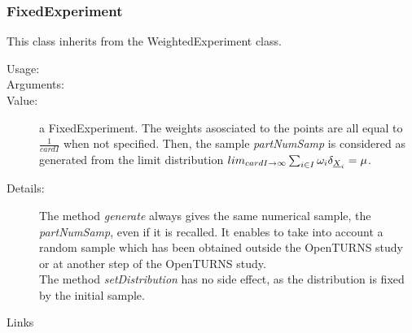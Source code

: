 \subsubsection{FixedExperiment}


This class inherits from the WeightedExperiment class.\\

\begin{description}

\item[Usage:] \rule{0pt}{1em}

\item[Arguments:]   \rule{0pt}{1em}

\item[Value:] a FixedExperiment. The weights asosciated to the points are all equal to $\displaystyle \frac{1}{cardI}$ when not specified. Then, the sample \textit{partNumSamp} is considered as generated from the limit distribution $lim_{card I \rightarrow\infty} \sum_{i \in I} \omega_i \delta_{{\underline{X}}_i} = \mu$.

\item[Details:]  The method \textit{generate}  always gives  the same numerical sample, the \textit{partNumSamp}, even if it is recalled. It enables to take into account a random sample which has been obtained outside the OpenTURNS study or at another step of the OpenTURNS study.\\
The method \emph{setDistribution} has no side effect, as the distribution is fixed by the initial sample.


\item[Links] \rule{0pt}{1em}
\end{description}

\newpage
